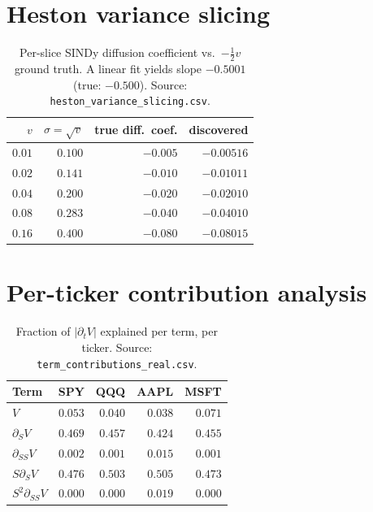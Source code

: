 \documentclass[10pt]{article}
\begin{document}
\section{Heston variance slicing}\label{app:heston}
\begin{table}[h]
\centering\footnotesize
\caption{Per-slice SINDy diffusion coefficient vs.\ $-\tfrac{1}{2}v$ ground truth. A linear fit yields slope $-0.5001$ (true: $-0.500$). Source: \texttt{heston\_variance\_slicing.csv}.}
\begin{tabular}{rrrr}
\toprule
$v$ & $\sigma{=}\sqrt{v}$ & true diff.\ coef. & discovered \\
\midrule
$0.01$ & $0.100$ & $-0.005$ & $-0.00516$ \\
$0.02$ & $0.141$ & $-0.010$ & $-0.01011$ \\
$0.04$ & $0.200$ & $-0.020$ & $-0.02010$ \\
$0.08$ & $0.283$ & $-0.040$ & $-0.04010$ \\
$0.16$ & $0.400$ & $-0.080$ & $-0.08015$ \\
\bottomrule
\end{tabular}
\end{table}

\section{Per-ticker contribution analysis}\label{app:contrib}
\begin{table}[h]
\centering\footnotesize
\caption{Fraction of $|\partial_t V|$ explained per term, per ticker. Source: \texttt{term\_contributions\_real.csv}.}
\begin{tabular}{lrrrr}
\toprule
Term & SPY & QQQ & AAPL & MSFT \\
\midrule
$V$                  & $0.053$ & $0.040$ & $0.038$ & $0.071$ \\
$\partial_S V$       & $0.469$ & $0.457$ & $0.424$ & $0.455$ \\
$\partial_{SS} V$    & $0.002$ & $0.001$ & $0.015$ & $0.001$ \\
$S\partial_S V$      & $0.476$ & $0.503$ & $0.505$ & $0.473$ \\
$S^2\partial_{SS}V$  & $0.000$ & $0.000$ & $0.019$ & $0.000$ \\
\bottomrule
\end{tabular}
\end{table}
\end{document}
